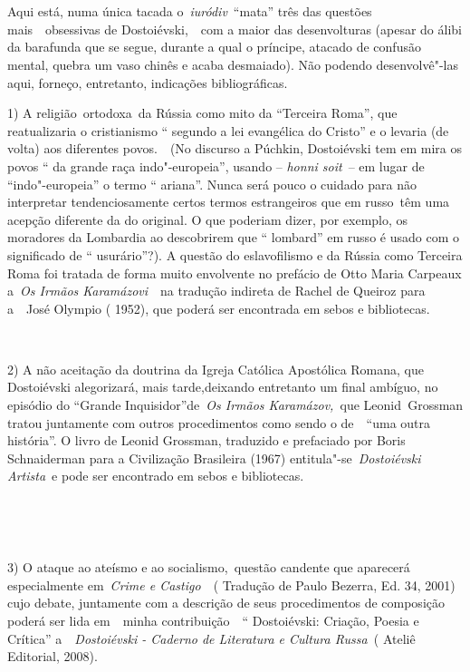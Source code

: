 \emph{~}

\emph{~}

Aqui está, numa única tacada o~\emph{iuródiv}~``mata'' três das questões
mais~~obsessivas de Dostoiévski,~~com a maior das desenvolturas (apesar
do álibi da barafunda que se segue, durante a qual o príncipe, atacado
de confusão mental, quebra um vaso chinês e acaba desmaiado). Não
podendo desenvolvê"-las aqui, forneço, entretanto, indicações
bibliográficas.

1) A religião~ortodoxa~da Rússia como mito da ``Terceira Roma'', que
reatualizaria o cristianismo `` segundo a lei evangélica do Cristo'' e o
levaria (de volta) aos diferentes povos.~~(No discurso a Púchkin,
Dostoiévski tem em mira os povos `` da grande raça indo"-europeia'',
usando -- \emph{honni soit}~-- em lugar de ``indo"-europeia'' o termo ``
ariana''. Nunca será pouco o cuidado para não interpretar
tendenciosamente certos termos estrangeiros que em russo~têm uma acepção
diferente da do original. O que poderiam dizer, por exemplo, os
moradores da Lombardia ao descobrirem que `` lombard'' em russo é usado
com o significado de `` usurário''?). A questão do eslavofilismo e da
Rússia como Terceira Roma foi tratada de forma muito envolvente no
prefácio de Otto Maria Carpeaux a~\emph{Os Irmãos Karamázovi}~~na
tradução indireta de Rachel de Queiroz para a~~José Olympio ( 1952), que
poderá ser encontrada em sebos e bibliotecas.

~

2) A não aceitação da doutrina da Igreja Católica Apostólica Romana, que
Dostoiévski alegorizará, mais tarde,deixando entretanto um final
ambíguo, no episódio do ``Grande Inquisidor''de~\emph{Os Irmãos
Karamázov,~}que Leonid\emph{~}Grossman tratou juntamente com outros
procedimentos como sendo o de~~``uma outra história''. O livro de Leonid
Grossman, traduzido e prefaciado por Boris Schnaiderman para a
Civilização Brasileira (1967) entitula"-se~\emph{Dostoiévski Artista}~e
pode ser encontrado em sebos e bibliotecas.

~

\emph{~}

3) O ataque ao ateísmo e ao socialismo,~questão candente que aparecerá
especialmente em~\emph{Crime e Castigo}~~( Tradução de Paulo Bezerra,
Ed. 34, 2001) cujo debate, juntamente com a descrição de seus
procedimentos de composição poderá ser lida em~~minha contribuição~~``
Dostoiévski: Criação, Poesia e Crítica'' a~~\emph{Dostoiévski - Caderno
de Literatura e Cultura Russa~}( Ateliê Editorial, 2008).

